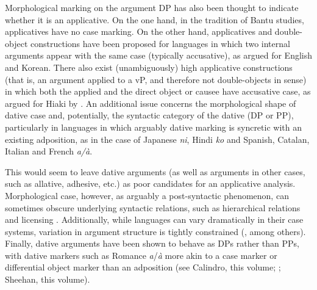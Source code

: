 \documentclass[output=paper,colorlinks,citecolor=brown,nonflat]{./langscibook}
\begin{document}
Morphological marking on the argument DP has also been thought to indicate whether it is an applicative. On the one hand, in the tradition of Bantu studies, applicatives have no case marking. On the other hand, applicatives and double-object constructions have been proposed for languages in which two internal arguments appear with the same case (typically accusative), as argued for English and Korean. There also exist (unambiguously) high applicative constructions (that is, an argument applied to a vP, and therefore not double-objects in  sense) in which both the applied and the direct object or causee have accusative case, as argued for Hiaki by \citet{Harley2013}. An additional issue concerns the morphological shape of dative case and, potentially, the syntactic category of the dative (DP or PP), particularly in languages in which arguably dative marking is syncretic with an existing adposition, as in the case of Japanese \textit{ni}, Hindi \textit{ko} and Spanish, Catalan, Italian and French \textit{a/à}.

This would seem to leave dative arguments (as well as arguments in other cases, such as allative, adhesive, etc.) as poor candidates for an applicative analysis. Morphological case, however, as arguably a post-syntactic phenomenon, can sometimes obscure underlying syntactic relations, such as hierarchical relations and licensing \citep{McGinnis2018}. Additionally, while languages can vary dramatically in their case systems, variation in argument structure is tightly constrained (\citealt{Marantz2013, WoodMarantz2017}, among others). Finally, dative arguments have been shown to behave as DPs rather than PPs, with dative markers such as Romance \textit{a}/\textit{à} more akin to a case marker or differential object marker than an adposition (see Calindro, this volume; \citealt{Pineda2016}; Sheehan, this volume). 
\end{document}
